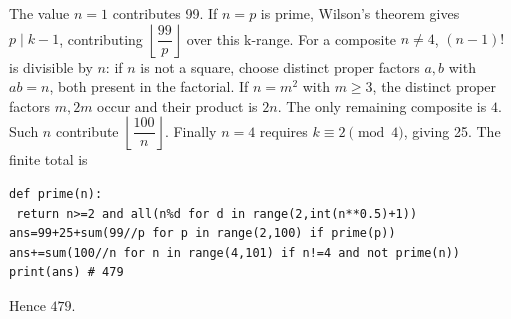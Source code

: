 The value $n=1$ contributes 99. If $n=p$ is prime, Wilson's theorem gives $p\mid k-1$, contributing $\left\lfloor\dfrac{99}{p}\right\rfloor$ over this k-range. For a composite $n\ne4$, $(n-1)!$ is divisible by $n$: if $n$ is not a square, choose distinct proper factors $a,b$ with $ab=n$, both present in the factorial. If $n=m^2$ with $m\ge3$, the distinct proper factors $m,2m$ occur and their product is $2n$. The only remaining composite is $4$. Such $n$ contribute $\left\lfloor\dfrac{100}{n}\right\rfloor$. Finally $n=4$ requires $k\equiv2\pmod4$, giving 25. The finite total is\begin{verbatim}
def prime(n):
 return n>=2 and all(n%d for d in range(2,int(n**0.5)+1))
ans=99+25+sum(99//p for p in range(2,100) if prime(p))
ans+=sum(100//n for n in range(4,101) if n!=4 and not prime(n))
print(ans) # 479
\end{verbatim}
Hence $\boxed{479}$.
